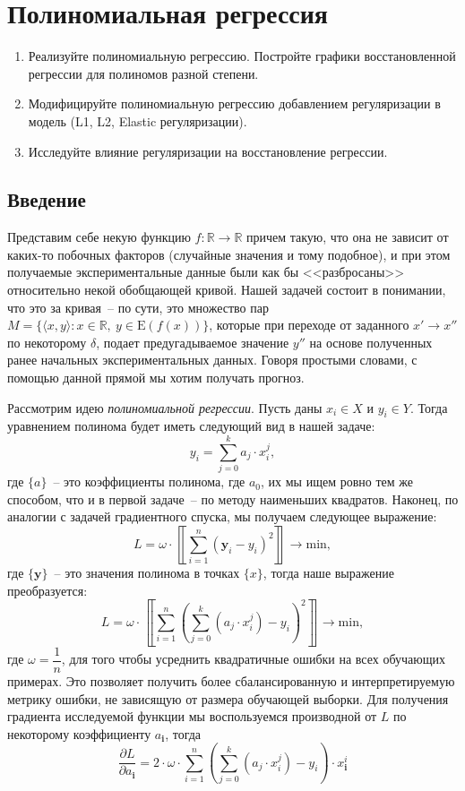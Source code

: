 \documentclass[12pt, a4paper, oneside, final]{article}
\begin{document}
	\section*{Полиномиальная регрессия}
	\begin{enumerate}[1.]
		\item
		Реализуйте полиномиальную регрессию.
		Постройте графики восстановленной регрессии для полиномов разной степени.
		\item
		Модифицируйте полиномиальную регрессию добавлением регуляризации в модель (L1, L2, Elastic регуляризации).
		\item
		Исследуйте влияние регуляризации на восстановление регрессии.
	\end{enumerate}
	\subsection*{Введение}
	Представим себе некую функцию $f : \mathbb{R} \to \mathbb{R}$ причем такую, что она не зависит от каких-то побочных факторов (случайные значения и тому подобное), и при этом получаемые экспериментальные данные были как бы <<разбросаны>> относительно некой обобщающей кривой.
	Нашей задачей состоит в понимании, что это за кривая~-- по сути, это множество пар $M = \{\langle x, y\rangle : x \in \mathbb{R}, ~ y \in \mathrm{E}{(f(x))}\}$, которые при переходе от заданного $x' \to x''$ по некоторому $\delta$, подает предугадываемое значение $y''$ на основе полученных ранее начальных экспериментальных данных.
	Говоря простыми словами, с помощью данной прямой мы хотим получать прогноз.

	Рассмотрим идею \textit{полиномиальной регрессии}.
	Пусть даны $x_{i} \in X$ и $y_{i} \in Y$.
	Тогда уравнением полинома будет иметь следующий вид в нашей задаче:
	\[
		y_{i} = \sum\limits_{j = 0}^{k}{a_{j} \cdot x_{i}^{j}},
	\]
	где $\{a\}$~-- это коэффициенты полинома, где $a_{0}$, их мы ищем ровно тем же способом, что и в первой задаче~-- по методу наименьших квадратов.
	Наконец, по аналогии с задачей градиентного спуска, мы получаем следующее выражение:
	\[
		L = \omega \cdot \left\llbracket\sum\limits_{i = 1}^{n}{\left(\mathbf{y}_{i} - y_{i}\right)^{2}}\right\rrbracket \to \mathrm{min},
	\]
	где $\{\mathbf{y}\}$~-- это значения полинома в точках $\{x\}$, тогда наше выражение преобразуется:
	\[
		L = \omega\cdot\left\llbracket\sum\limits_{i = 1}^{n}{\left(\sum\limits_{j = 0}^{k}{\left(a_{j} \cdot x^{j}_{i}\right)} - y_{i}\right)^{2}}\right\rrbracket \to \mathrm{min},
	\]
	где $\omega = \dfrac{1}{n}$, для того чтобы усреднить квадратичные ошибки на всех обучающих примерах.
	Это позволяет получить более сбалансированную и интерпретируемую метрику ошибки, не зависящую от размера обучающей выборки.
	Для получения градиента исследуемой функции мы воспользуемся производной от $L$ по некоторому коэффициенту $a_{\mathbf{i}}$, тогда
	\[
		\dfrac{\partial{L}}{\partial{a_{\mathbf{i}}}} = 2\cdot\omega\cdot\sum\limits_{i = 1}^{n}{\left(\sum\limits_{j = 0}^{k}{\left(a_{j} \cdot x_{i}^{j}\right)} - y_{i}\right) \cdot x^{i}_{\mathbf{i}}}
	\]
\end{document}
